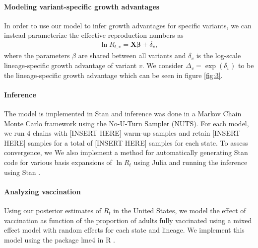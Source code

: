 \documentclass[12pt]{article}
\renewcommand{\vec}[1]{\boldsymbol{#1}}
\begin{document}
\paragraph{Modeling variant-specific growth advantages}%
In order to use our model to infer growth advantages for specific variants, we can instead parameterize the effective reproduction numbers as
\begin{align*}
\ln R_{t,v} = \vec{X} \vec{\beta} + \delta_{v},
\end{align*}
where the parameters $\beta$ are shared between all variants and $\delta_{v}$ is the log-scale lineage-specific growth advantage of variant $v$. 
We consider $\Delta_{v} = \exp(\delta_{v})$ to be the lineage-specific growth advantage which can be seen in figure \ref{fig:3}.

\paragraph{Inference}%

The model is implemented in Stan and inference was done in a Markov Chain Monte Carlo framework using the No-U-Turn Sampler (NUTS). \cites{carpenter2017stan, hoffman2011nouturn} 
For each model, we run 4 chains with [INSERT HERE] warm-up samples and retain [INSERT HERE] samples for a total of [INSERT HERE] samples for each state. 
To assess convergence, we 
We also implement a method for automatically generating Stan code for various basis expansions of $\ln R_{t}$ using Julia and running the inference using Stan \cites{bezanson2017julia, carpenter2017stan}.

\paragraph{Analyzing vaccination}%

Using our posterior estimates of $R_{t}$ in the United States, we model the effect of vaccination as function of the proportion of adults fully vaccinated using a mixed effect model with random effects for each state and lineage. We implement this model using the package lme4 in R \cites{Bates2015, RLang2017}.

\end{document}
